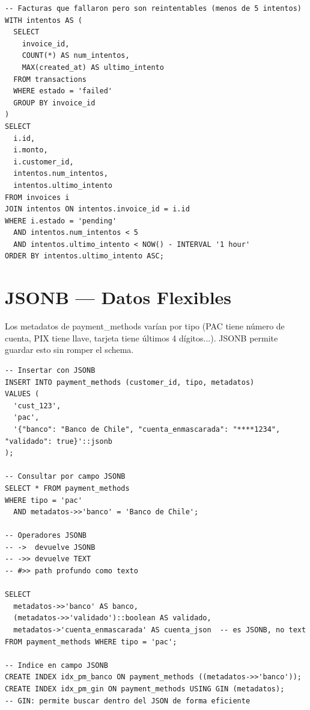 \documentclass[11pt,a4paper]{article}
\begin{document}
\begin{lstlisting}[style=sql]
-- Facturas que fallaron pero son reintentables (menos de 5 intentos)
WITH intentos AS (
  SELECT
    invoice_id,
    COUNT(*) AS num_intentos,
    MAX(created_at) AS ultimo_intento
  FROM transactions
  WHERE estado = 'failed'
  GROUP BY invoice_id
)
SELECT
  i.id,
  i.monto,
  i.customer_id,
  intentos.num_intentos,
  intentos.ultimo_intento
FROM invoices i
JOIN intentos ON intentos.invoice_id = i.id
WHERE i.estado = 'pending'
  AND intentos.num_intentos < 5
  AND intentos.ultimo_intento < NOW() - INTERVAL '1 hour'
ORDER BY intentos.ultimo_intento ASC;
\end{lstlisting}

\section{JSONB — Datos Flexibles}

\begin{contextobox}
Los metadatos de payment\_methods varían por tipo (PAC tiene número de cuenta, PIX tiene llave,
tarjeta tiene últimos 4 dígitos...). JSONB permite guardar esto sin romper el schema.
\end{contextobox}

\begin{lstlisting}[style=sql]
-- Insertar con JSONB
INSERT INTO payment_methods (customer_id, tipo, metadatos)
VALUES (
  'cust_123',
  'pac',
  '{"banco": "Banco de Chile", "cuenta_enmascarada": "****1234", "validado": true}'::jsonb
);

-- Consultar por campo JSONB
SELECT * FROM payment_methods
WHERE tipo = 'pac'
  AND metadatos->>'banco' = 'Banco de Chile';

-- Operadores JSONB
-- ->  devuelve JSONB
-- ->> devuelve TEXT
-- #>> path profundo como texto

SELECT
  metadatos->>'banco' AS banco,
  (metadatos->>'validado')::boolean AS validado,
  metadatos->'cuenta_enmascarada' AS cuenta_json  -- es JSONB, no text
FROM payment_methods WHERE tipo = 'pac';

-- Indice en campo JSONB
CREATE INDEX idx_pm_banco ON payment_methods ((metadatos->>'banco'));
CREATE INDEX idx_pm_gin ON payment_methods USING GIN (metadatos);
-- GIN: permite buscar dentro del JSON de forma eficiente
\end{lstlisting}

\end{document}
